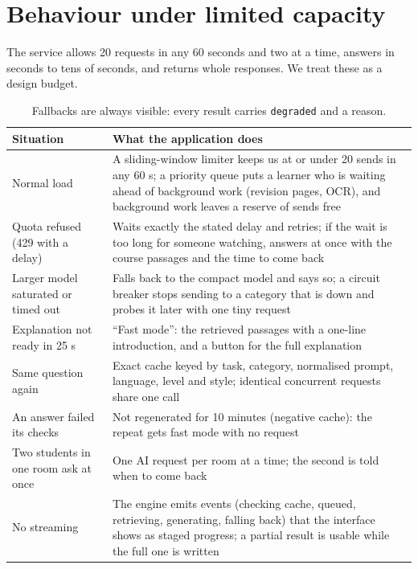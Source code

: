 \documentclass[11pt,a4paper]{article}
\newcommand{\code}[1]{\texttt{\small #1}}
\begin{document}
\section{Behaviour under limited capacity}

The service allows 20 requests in any 60 seconds and two at a time, answers in seconds to tens of seconds, and
returns whole responses. We treat these as a design budget.

\begin{table}[H]
\centering\small
\begin{tabularx}{\textwidth}{@{}p{4.6cm}Y@{}}
\toprule
\textbf{Situation} & \textbf{What the application does} \\
\midrule
Normal load & A sliding-window limiter keeps us at or under 20 sends in any 60 s; a priority queue puts a learner who is waiting ahead of background work (revision pages, OCR), and background work leaves a reserve of sends free \\
Quota refused (429 with a delay) & Waits exactly the stated delay and retries; if the wait is too long for someone watching, answers at once with the course passages and the time to come back \\
Larger model saturated or timed out & Falls back to the compact model and says so; a circuit breaker stops sending to a category that is down and probes it later with one tiny request \\
Explanation not ready in 25 s & ``Fast mode'': the retrieved passages with a one-line introduction, and a button for the full explanation \\
Same question again & Exact cache keyed by task, category, normalised prompt, language, level and style; identical concurrent requests share one call \\
An answer failed its checks & Not regenerated for 10 minutes (negative cache): the repeat gets fast mode with no request \\
Two students in one room ask at once & One AI request per room at a time; the second is told when to come back \\
No streaming & The engine emits events (checking cache, queued, retrieving, generating, falling back) that the interface shows as staged progress; a partial result is usable while the full one is written \\
\bottomrule
\end{tabularx}
\caption{Fallbacks are always visible: every result carries \code{degraded} and a reason.}
\end{table}
\vspace{-6pt}
\end{document}
